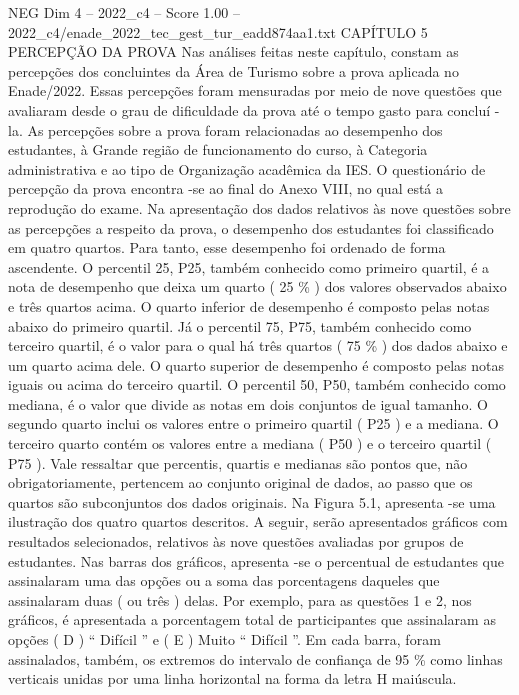 \begin{textsample}{NEG Dim 4 – 2022\_c4 – Score 1.00 – 2022\_c4/enade\_2022\_tec\_gest\_tur\_eadd874aa1.txt}  \label{ex:f4_neg_212}
CAPÍTULO 5 PERCEPÇÃO DA PROVA Nas análises feitas neste capítulo, constam as percepções dos concluintes da Área de Turismo sobre a prova aplicada no Enade/2022.
Essas percepções foram mensuradas por meio de nove questões que avaliaram desde o grau de dificuldade da prova até o tempo gasto para concluí -la.
As percepções sobre a prova foram relacionadas ao desempenho dos estudantes, à Grande região de funcionamento do curso, à Categoria administrativa e ao tipo de Organização acadêmica da IES.
O questionário de percepção da prova encontra -se ao final do Anexo VIII, no qual está a reprodução do exame.
Na apresentação dos dados relativos às nove questões sobre as percepções a respeito da prova, o desempenho dos estudantes foi classificado em quatro quartos.
Para tanto, esse desempenho foi ordenado de forma ascendente.
O percentil 25, P25, também conhecido como primeiro quartil, é a nota de desempenho que deixa um quarto ( 25 \% ) dos valores observados abaixo e três quartos acima.
O quarto inferior de desempenho é composto pelas notas abaixo do primeiro quartil.
Já o percentil 75, P75, também conhecido como terceiro quartil, é o valor para o qual há três quartos ( 75 \% ) dos dados abaixo e um quarto acima dele.
O quarto superior de desempenho é composto pelas notas iguais ou acima do terceiro quartil.
O percentil 50, P50, também conhecido como mediana, é o valor que divide as notas em dois conjuntos de igual tamanho.
O segundo quarto inclui os valores entre o primeiro quartil ( P25 ) e a mediana.
O terceiro quarto contém os valores entre a mediana ( P50 ) e o terceiro quartil ( P75 ).
Vale ressaltar que percentis, quartis e medianas são pontos que, não obrigatoriamente, pertencem ao conjunto original de dados, ao passo que os quartos são subconjuntos dos dados originais.
Na Figura 5.1, apresenta -se uma ilustração dos quatro quartos descritos.
A seguir, serão apresentados gráficos com resultados selecionados, relativos às nove questões avaliadas por grupos de estudantes.
Nas barras dos gráficos, apresenta -se o percentual de estudantes que assinalaram uma das opções ou a soma das porcentagens daqueles que assinalaram duas ( ou três ) delas.
Por exemplo, para as questões 1 e 2, nos gráficos, é apresentada a porcentagem total de participantes que assinalaram as opções ( D ) “ Difícil ” e ( E ) Muito “ Difícil ”.
Em cada barra, foram assinalados, também, os extremos do intervalo de confiança de 95 \% como linhas verticais unidas por uma linha horizontal na forma da letra H maiúscula.

\end{textsample}
